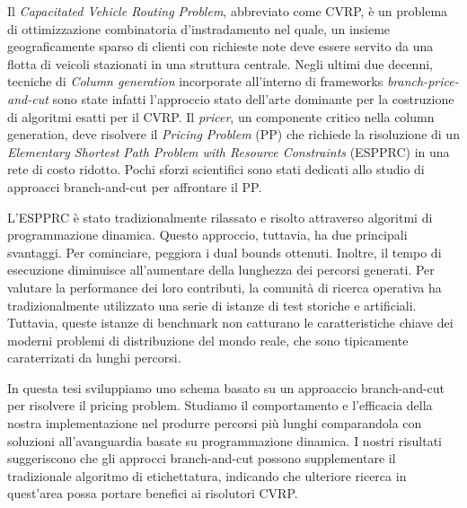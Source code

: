 {
\setlength\parindent{0pt}

Il \textit{Capacitated Vehicle Routing Problem}, abbreviato come CVRP, è un problema di ottimizzazione combinatoria d'instradamento nel quale, un insieme geograficamente sparso di clienti con richieste note deve essere servito da una flotta di veicoli stazionati in una struttura centrale.
Negli ultimi due decenni, tecniche di \textit{Column generation} incorporate all'interno di frameworks \textit{branch-price-and-cut} sono state infatti l'approccio stato dell'arte dominante per la costruzione di algoritmi esatti per il CVRP.
Il \textit{pricer}, un componente critico nella column generation, deve risolvere il \textit{Pricing Problem} (PP) che richiede la risoluzione di un \textit{Elementary Shortest Path Problem with Resource Constraints} (ESPPRC) in una rete di costo ridotto.
Pochi sforzi scientifici sono stati dedicati allo studio di approacci branch-and-cut per affrontare il PP.

L'ESPPRC è stato tradizionalmente rilassato e risolto attraverso algoritmi di programmazione dinamica.
Questo approccio, tuttavia, ha due principali svantaggi.
Per cominciare, peggiora i dual bounds ottenuti.
Inoltre, il tempo di esecuzione diminuisce all'aumentare della lunghezza dei percorsi generati.
Per valutare la performance dei loro contributi, la comunità di ricerca operativa ha tradizionalmente utilizzato una serie di istanze di test storiche e artificiali.
Tuttavia, queste istanze di benchmark non catturano le caratteristiche chiave dei moderni problemi di distribuzione del mondo reale, che sono tipicamente caraterrizati da lunghi percorsi.

In questa tesi sviluppiamo uno schema basato su un approaccio branch-and-cut per risolvere il pricing problem.
Studiamo il comportamento e l'efficacia della nostra implementazione nel produrre percorsi più lunghi comparandola con soluzioni all'avanguardia basate su programmazione dinamica.
I nostri risultati suggeriscono che gli approcci branch-and-cut possono supplementare il tradizionale algoritmo di etichettatura, indicando che ulteriore ricerca in quest'area possa portare benefici ai risolutori CVRP.
}
